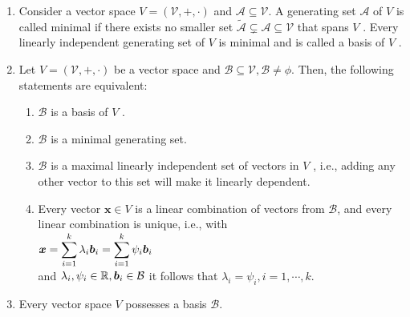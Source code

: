 \begin{enumerate}
    \item
    \begin{definition}[Basis]
        Consider a vector space $V = (\mathcal{V}, +, \cdot)$ and $\mathcal{A} \subseteq  \mathcal{V}$.
        A generating set $\mathcal{A}$ of $V$ is called minimal if there exists no smaller set $\tilde{\mathcal{A}} \subsetneq \mathcal{A} \subseteq \mathcal{V}$ that spans $V$ .
        Every linearly independent generating set of $V$ is minimal and is called a basis of $V$ .
        \hfill \cite{mfml/book/mml/Deisenroth-Faisal-Ong}
    \end{definition}

    \item Let $V = (\mathcal{V}, +, \cdot)$ be a vector space and $\mathcal{B} \subseteq \mathcal{V}, \mathcal{B} \neq \phi$. Then, the following statements are equivalent:
    \hfill \cite{mfml/book/mml/Deisenroth-Faisal-Ong}
    \begin{enumerate}
        \item $\mathcal{B}$ is a basis of $V$ .
        \hfill \cite{mfml/book/mml/Deisenroth-Faisal-Ong}

        \item $\mathcal{B}$ is a minimal generating set.
        \hfill \cite{mfml/book/mml/Deisenroth-Faisal-Ong}

        \item $\mathcal{B}$ is a maximal linearly independent set of vectors in $V$ , i.e., adding any other vector to this set will make it linearly dependent.
        \hfill \cite{mfml/book/mml/Deisenroth-Faisal-Ong}

        \item Every vector $\bm{x} \in V$ is a linear combination of vectors from $\mathcal{B}$, and every linear combination is unique, i.e., with
        \\
        $
            \bm{x}
            = \displaystyle\sum_{i=1}^k \lambda_i \bm{b}_i
            = \displaystyle\sum_{i=1}^k \psi_i \bm{b}_i
        $
        \\
        and $\lambda_i , \psi_i \in \mathbb{R}, \bm{b}_i \in \mathcal{B}$ it follows that $\lambda_i = \psi_i , i = 1, \cdots , k$.
        \hfill \cite{mfml/book/mml/Deisenroth-Faisal-Ong}
    \end{enumerate}

    \item Every vector space $V$ possesses a basis $\mathcal{B}$.
    \hfill \cite{mfml/book/mml/Deisenroth-Faisal-Ong}


\end{enumerate}
